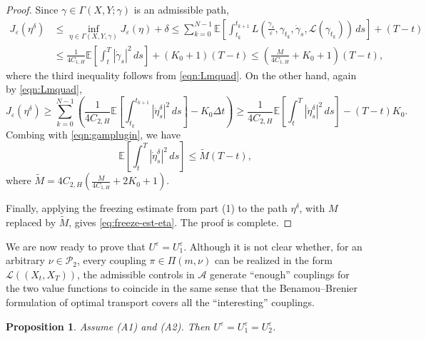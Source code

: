 \documentclass[reqno,11pt]{amsart}
\newtheorem{proposition}[theorem]{Proposition}
\numberwithin{equation}{section}
\newcommand{\e}{\varepsilon}
\newcommand{\ep}{\varepsilon}
\begin{document}
\begin{proof}
Since $\gamma \in \Gamma(X,Y; \gamma)$ is an admissible path,
\begin{equation}\label{eqn:gamplugin}
\begin{aligned}
    J_\ep(\eta^\delta) &\leq \inf_{\eta\in \Gamma(X,Y,\gamma)}
J_\ep(\eta)+\delta \leq \sum_{k=0}^{N-1}
\mathbb E \left[
\int_{t_k}^{t_{k+1}} L \left(
\frac{\gamma_s}{\varepsilon},\gamma_{t_k},
\dot{\gamma}_s,
\mathcal{L}(\gamma_{t_k})
\right)\,ds\right] +(T-t)\\
& \leq \frac{1}{4C_{1,H}} \mathbb{E}
\left[\int_{t}^{T} \left|\dot{\gamma}_s\right|^2\,ds\right]+(K_0+1)(T-t) \leq \left(\frac{M}{4C_{1,H}}+K_0+1\right)(T-t),
\end{aligned}
\end{equation}
where the third inequality follows from \eqref{eqn:Lmquad}. On the other hand, again by \eqref{eqn:Lmquad},
\[
J_\ep (\eta^\delta) \geq \sum_{k=0}^{N-1} \left(\frac{1}{4C_{2,H}}
\mathbb{E} \left[
\int_{t_k}^{t_{k+1}}  \left|\dot{\eta}^\delta_s \right|^2 \,ds \right] - K_0  \Delta t\right) \geq \frac{1}{4C_{2,H}} \mathbb{E}
\left[\int_t^{T}  \left|\dot{\eta}^\delta_s\right|^2 \,ds\right]-(T-t)K_0.
\]
Combing with \eqref{eqn:gamplugin}, we have
\[
\mathbb{E}
\left[\int_{t}^{T} \left|\dot{\eta}^\delta_s\right|^2 \,ds \right] \leq \tilde{M}(T-t),
\]
where $\tilde{M}=4C_{2,H}
\left(
\frac{M}{4C_{1,H}}+2K_0+1
\right)$.

Finally, applying the freezing estimate from part {\rm (1)} to the path $\eta^\delta$, with $M$ replaced by $\tilde{M}$, gives \eqref{eq:freeze-est-eta}. The proof is complete.
\end{proof}

We are now ready to prove that $U^\e=U^\e_1$. Although it is not clear whether, for an arbitrary $\nu\in\mathcal P_2$, every coupling $\pi\in\Pi(m,\nu)$ can be realized in the form $\mathcal L((X_t,X_T))$, the admissible controls in $\mathcal A$ generate ``enough'' couplings for the two value functions to coincide in the same sense that the Benamou--Brenier formulation of optimal transport covers all the ``interesting'' couplings.

\begin{proposition}\label{prop:U1eqUeqU2}
Assume (A1) and (A2). Then $U^\e=U^\e_1=U^\e_2$.
\end{proposition}
\end{document}
